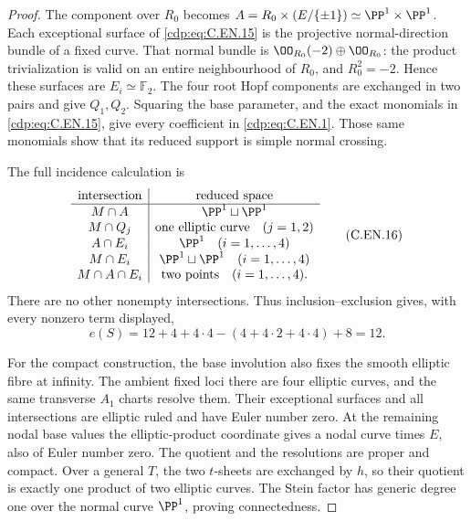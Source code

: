 \begin{proof}
The component over $R_0$ becomes
$A=R_0\times(E/\{\pm1\})\simeq\PP^1\times\PP^1$.
Each exceptional surface of \eqref{cdp:eq:C.EN.15}
is the projective normal-direction bundle
of a fixed curve. That normal bundle is
$\OO_{R_0}(-2)\oplus\OO_{R_0}$: the
product trivialization is valid on an
entire neighbourhood of $R_0$, and
$R_0^2=-2$. Hence these surfaces are
$E_i\simeq\mathbb F_2$.
The four root Hopf components are
exchanged in two pairs and give
$Q_1,Q_2$. Squaring the base parameter,
and the exact monomials in \eqref{cdp:eq:C.EN.15},
give every coefficient in \eqref{cdp:eq:C.EN.1}.
Those same monomials show that its
reduced support is simple normal
crossing.

The full incidence calculation is
\[
 \begin{array}{c|c}
 \text{intersection}&\text{reduced space}\\ \hline
 M\cap A&\PP^1\sqcup\PP^1\\
 M\cap Q_j&\text{one elliptic curve}\quad(j=1,2)\\
 A\cap E_i&\PP^1\quad(i=1,\ldots,4)\\
 M\cap E_i&\PP^1\sqcup\PP^1\quad(i=1,\ldots,4)\\
 M\cap A\cap E_i&\text{two points}\quad(i=1,\ldots,4).
 \end{array}                                             \tag{C.EN.16}\label{cdp:eq:C.EN.16}
\]
There are no other nonempty intersections.
Thus inclusion--exclusion gives, with
every nonzero term displayed,
\[
 e(S)=12+4+4\cdot4-(4+4\cdot2+4\cdot4)+8=12 .
                                                               \tag{C.EN.17}\label{cdp:eq:C.EN.17}
\]

For the compact construction, the base involution
also fixes the smooth elliptic fibre at infinity.
The ambient fixed loci there are four elliptic
curves, and the same transverse $A_1$ charts
resolve them. Their exceptional surfaces and
all intersections are elliptic ruled and
have Euler number zero. At the remaining
nodal base values the elliptic-product
coordinate gives a nodal curve times $E$,
also of Euler number zero. The quotient
and the resolutions are proper and compact.
Over a general $T$, the two $t$-sheets
are exchanged by $h$, so their quotient
is exactly one product of two elliptic
curves. The Stein factor has generic
degree one over the normal curve
$\PP^1$, proving connectedness.


\end{proof}
